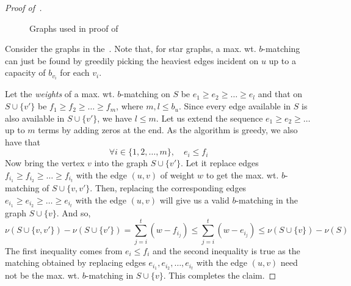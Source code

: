 \begin{proof}[Proof of~]
\begin{figure}[H]
\begin{minipage}{0.48\textwidth}
    \end{minipage}
    \caption{Graphs used in proof of }
    \label{fig:marginal_utility}
\end{figure}


    Consider the graphs in the~. Note that, for star graphs, a max. wt. $b$-matching can just be found by greedily picking the heaviest edges incident on $u$ up to a capacity of $b_{v_i}$ for each $v_i$. 
    
    Let the \textit{weights} of a max. wt. $b$-matching on $S$ be $e_1\geq e_2\geq \ldots \geq e_l$ and that on $S\cup \{v'\}$ be $f_1\geq f_2\geq \ldots \geq f_m$, where $m,l \leq b_u$. Since every edge available in $S$ is also available in $S\cup \{v'\}$, we have $l\leq m$. Let us extend the sequence $e_1\geq e_2\geq \ldots $ up to $m$ terms by adding zeros at the end. As the algorithm is greedy, we also have that $$\forall i\in \{1,2,\ldots,m\} , \quad e_i\leq f_i$$Now bring the vertex $v$ into the graph $S\cup \{v'\}$. Let it replace edges $f_{i_1} \geq f_{i_2} \geq \ldots \geq f_{i_t}$ with the edge $(u,v)$ of weight $w$ to get the max. wt. $b$-matching of $S\cup \{v,v'\}$. Then, replacing the corresponding edges $e_{i_1} \geq e_{i_2} \geq \ldots \geq  e_{i_t}$ with the edge $(u,v)$ will give us a valid $b$-matching in the graph $S\cup \{v\}$. And so, $$\nu(S\cup \{v,v'\}) - \nu(S\cup \{v'\}) = \sum_{j=i}^{t}(w-f_{i_j}) \leq \sum_{j=i}^{t}(w-e_{i_j}) \leq \nu(S\cup \{v\}) - \nu(S)$$ The first inequality comes from $e_i\leq f_i$ and the second inequality is true as the matching obtained by replacing edges $e_{i_1}, e_{i_2},\ldots, e_{i_t}$ with the edge $(u,v)$ need not be the max. wt. $b$-matching in $S\cup \{v\}$. This completes the claim. 
    
    
 \end{proof} 


